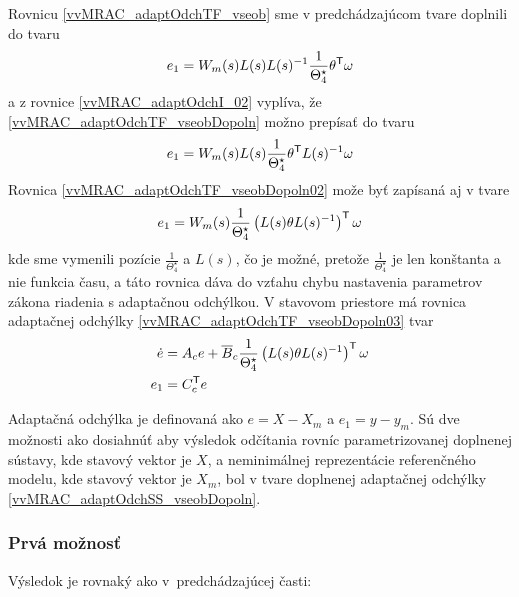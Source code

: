 ﻿\documentclass[a4paper, 10pt, ]{article}
\begin{document}
Rovnicu \eqref{vvMRAC_adaptOdchTF_vseob} sme v predchádzajúcom tvare doplnili do tvaru
\begin{equation} \label{vvMRAC_adaptOdchTF_vseobDopoln}
	e_1 = W_m(s) L(s) L(s)^{-1} \frac{1}{\Theta_4^\star} \theta^{\mathsf{T}} \omega
\end{equation}
a z rovnice \eqref{vvMRAC_adaptOdchI_02} vyplíva, že \eqref{vvMRAC_adaptOdchTF_vseobDopoln} možno prepísať do tvaru
\begin{equation} \label{vvMRAC_adaptOdchTF_vseobDopoln02}
	e_1 = W_m(s) L(s) \frac{1}{\Theta_4^\star} \theta^{\mathsf{T}} L(s)^{-1}  \omega
\end{equation}
Rovnica \eqref{vvMRAC_adaptOdchTF_vseobDopoln02} može byť zapísaná aj v tvare
\begin{equation} \label{vvMRAC_adaptOdchTF_vseobDopoln03}
	e_1  = W_m(s) \frac{1}{\Theta_4^\star} \left( L(s) \theta L(s)^{-1} \right)^{\mathsf{T}} \omega
\end{equation}
kde sme vymenili pozície $\frac{1}{\Theta_4^\star}$ a $L(s)$, čo je možné, pretože $\frac{1}{\Theta_4^\star}$ je len konštanta a nie funkcia času, a táto rovnica dáva do vzťahu chybu nastavenia parametrov zákona riadenia s adaptačnou odchýlkou. V stavovom priestore má rovnica  adaptačnej odchýlky \eqref{vvMRAC_adaptOdchTF_vseobDopoln03} tvar
\begin{subequations} \label{vvMRAC_adaptOdchSS_vseobDopoln}
	\begin{align}
		\dot{e} &= A_c e + \overline{B}_c \frac{1}{\Theta_4^\star} \left( L(s) \theta L(s)^{-1} \right)^{\mathsf{T}} \omega \\
		e_1 &= C_c^{\mathsf{T}} e
	\end{align}
\end{subequations}

Adaptačná odchýlka je definovaná ako $e = X - X_m$ a $e_1 = y - y_m$. Sú dve možnosti ako dosiahnúť aby výsledok odčítania rovníc parametrizovanej doplnenej sústavy, kde stavový vektor je $X$, a neminimálnej reprezentácie referenčného modelu, kde stavový vektor je $X_m$, bol v tvare doplnenej adaptačnej odchýlky \eqref{vvMRAC_adaptOdchSS_vseobDopoln}.






\subsubsection{Prvá možnosť}

Výsledok je rovnaký ako v~predchádzajúcej časti:
\end{document}
